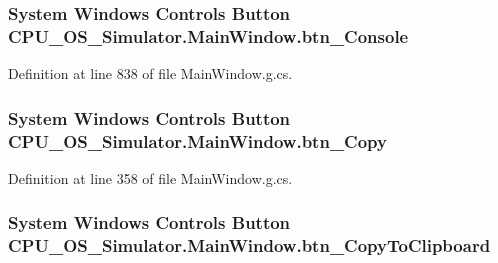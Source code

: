 \subsubsection[{btn\+\_\+\+Console}]{\setlength{\rightskip}{0pt plus 5cm}System Windows Controls Button C\+P\+U\+\_\+\+O\+S\+\_\+\+Simulator.\+Main\+Window.\+btn\+\_\+\+Console\hspace{0.3cm}{\ttfamily [package]}}\label{class_c_p_u___o_s___simulator_1_1_main_window_a9c127982ee67a80b67a9184b3a6e83d3}


Definition at line 838 of file Main\+Window.\+g.\+cs.

\hypertarget{class_c_p_u___o_s___simulator_1_1_main_window_a55b2516a7b78d0e79deac7f1a79f3a92}{}
\subsubsection[{btn\+\_\+\+Copy}]{\setlength{\rightskip}{0pt plus 5cm}System Windows Controls Button C\+P\+U\+\_\+\+O\+S\+\_\+\+Simulator.\+Main\+Window.\+btn\+\_\+\+Copy\hspace{0.3cm}{\ttfamily [package]}}\label{class_c_p_u___o_s___simulator_1_1_main_window_a55b2516a7b78d0e79deac7f1a79f3a92}


Definition at line 358 of file Main\+Window.\+g.\+cs.

\hypertarget{class_c_p_u___o_s___simulator_1_1_main_window_ad56a38e017d6d47d2076b1ec33e3521d}{}
\subsubsection[{btn\+\_\+\+Copy\+To\+Clipboard}]{\setlength{\rightskip}{0pt plus 5cm}System Windows Controls Button C\+P\+U\+\_\+\+O\+S\+\_\+\+Simulator.\+Main\+Window.\+btn\+\_\+\+Copy\+To\+Clipboard\hspace{0.3cm}{\ttfamily [package]}}\label{class_c_p_u___o_s___simulator_1_1_main_window_ad56a38e017d6d47d2076b1ec33e3521d}


